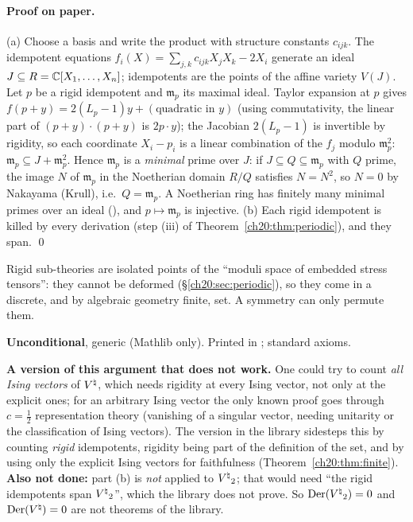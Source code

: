 \paragraph{Proof on paper.}  (a) Choose a basis and write the product with structure constants $c_{ijk}$.  The
idempotent equations $f_i(X)=\sum_{j,k}c_{ijk}X_jX_k-2X_i$ generate an ideal $J\subseteq R={\mathbb{C}}[X_1,\dots,X_n]$; idempotents
are the points of the affine variety $V(J)$.  Let $p$ be a rigid idempotent and $\mathfrak m_p$ its maximal ideal.  Taylor
expansion at $p$ gives $f(p+y)=2(L_p-1)y+(\text{quadratic in }y)$ (using commutativity, the linear part of
$(p+y)\cdot(p+y)$ is $2p\cdot y$); the Jacobian $2(L_p-1)$ is invertible by rigidity, so each coordinate $X_i-p_i$ is a linear
combination of the $f_j$ modulo $\mathfrak m_p^2$: $\mathfrak m_p\subseteq J+\mathfrak m_p^2$.  Hence $\mathfrak m_p$ is a
\emph{minimal} prime over $J$: if $J\subseteq Q\subseteq\mathfrak m_p$ with $Q$ prime, the image $N$ of $\mathfrak m_p$ in the
Noetherian domain $R/Q$ satisfies $N=N^2$, so $N=0$ by Nakayama (Krull), i.e.\ $Q=\mathfrak m_p$.  A Noetherian ring has
finitely many minimal primes over an ideal (), and $p\mapsto\mathfrak m_p$
is injective.  (b) Each rigid idempotent is killed by every derivation (step (iii) of Theorem~\ref{ch20:thm:periodic}), and
they span. \qed
\begin{physics}
Rigid sub-theories are isolated points of the ``moduli space of embedded stress tensors'': they cannot be deformed
(\S\ref{ch20:sec:periodic}), so they come in a discrete, and by algebraic geometry finite, set.  A symmetry can only permute
them.
\end{physics}
\begin{status}
\textbf{Unconditional}, generic (Mathlib only).  Printed in ;
standard axioms.
\end{status}

\begin{warning}
\textbf{A version of this argument that does not work.}  One could try to
count
\emph{all Ising vectors} of ${V^{\natural}}$, which needs rigidity at every Ising vector, not only at the explicit ones; for an
arbitrary Ising vector the only known proof goes through $c=\tfrac12$ representation theory (vanishing of a singular vector,
needing unitarity or the classification of Ising vectors).  The version in the library sidesteps this by counting
\emph{rigid} idempotents, rigidity being part of the definition of the set, and by using only the explicit Ising vectors
for faithfulness (Theorem~\ref{ch20:thm:finite}).  \textbf{Also not done:} part (b) is \emph{not} applied to ${V^{\natural}}_2$; that
would need ``the rigid idempotents span ${V^{\natural}}_2$'', which the library does not prove.  So $\mathrm{Der}({V^{\natural}}_2)=0$ and
$\mathrm{Der}({V^{\natural}})=0$ are not theorems of the library.
\end{warning}

